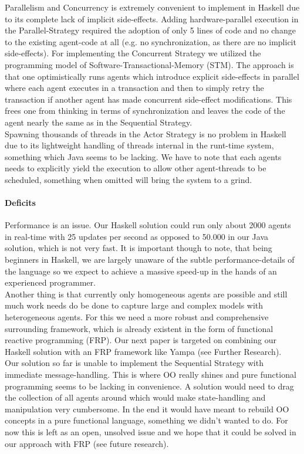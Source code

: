 Parallelism and Concurrency is extremely convenient to implement in Haskell due to its complete lack of implicit side-effects. Adding hardware-parallel execution in the Parallel-Strategy required the adoption of only 5 lines of code and no change to the existing agent-code at all (e.g. no synchronization, as there are no implicit side-effects). For implementing the Concurrent Strategy we utilized the programming model of Software-Transactional-Memory (STM). The approach is that one optimistically runs agents which introduce explicit side-effects in parallel where each agent executes in a transaction and then to simply retry the transaction if another agent has made concurrent side-effect modifications. This frees one from thinking in terms of synchronization and leaves the code of the agent nearly the same as in the Sequential Strategy. \\
Spawning thousands of threads in the Actor Strategy is no problem in Haskell due to its lightweight handling of threads internal in the runt-time system, something which Java seems to be lacking. We have to note that each agents needs to explicitly yield the execution to allow other agent-threads to be scheduled, something when omitted will bring the system to a grind.

\paragraph{Deficits}
Performance is an issue. Our Haskell solution could run only about 2000 agents in real-time with 25 updates per second as opposed to 50.000 in our Java solution, which is not very fast. It is important though to note, that being beginners in Haskell, we are largely unaware of the subtle performance-details of the language so we expect to achieve a massive speed-up in the hands of an experienced programmer. \\

Another thing is that currently only homogeneous agents are possible and still much work needs do be done to capture large and complex models with heterogeneous agents. For this we need a more robust and comprehensive surrounding framework, which is already existent in the form of functional reactive programming (FRP). Our next paper is targeted on combining our Haskell solution with an FRP framework like Yampa (see Further Research). \\ 

Our solution so far is unable to implement the Sequential Strategy with immediate message-handling. This is where OO really shines and pure functional programming seems to be lacking in convenience. A solution would need to drag the collection of all agents around which would make state-handling and manipulation very cumbersome. In the end it would have meant to rebuild OO concepts in a pure functional language, something we didn't wanted to do. For now this is left as an open, unsolved issue and we hope that it could be solved in our approach with FRP (see future research).

